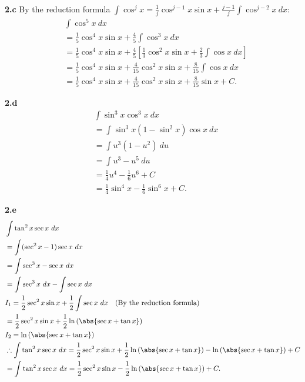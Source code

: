 \documentclass{report}
\begin{document}
    \pagebreak  \bigbreak \noindent 
    \textbf{2.c}
    \bigbreak \noindent 
    By the reduction formula $\int \cos^{j}{x} = \frac{1}{j}\cos^{j-1}{x}\sin{x} + \frac{j-1}{j}\int \cos^{j-2}{x}\ dx $:
    \begin{align*}
        &\int \cos^{5}{x}\ dx \\
        &= \frac{1}{5}\cos^{4}{x}\sin{x} + \frac{4}{5}\int \cos^{3}{x}\ dx \\
        &= \frac{1}{5}\cos^{4}{x}\sin{x} + \frac{4}{5}\left[\frac{1}{3}\cos^{2}{x}\sin{x}+\frac{2}{3}\int \cos{x}\ dx\right] \\
        &= \frac{1}{5}\cos^{4}{x}\sin{x} + \frac{4}{15}\cos^{2}{x}\sin{x}+\frac{8}{15}\int \cos{x}\ dx \\
        &= \frac{1}{5}\cos^{4}{x}\sin{x} + \frac{4}{15}\cos^{2}{x}\sin{x}+\frac{8}{15}\sin{x} + C
    .\end{align*}

    \bigbreak \noindent 
    \textbf{2.d}
    \bigbreak \noindent 
    \begin{align*}
        &\int \sin^{3}{x}\cos^{3}{x}\ dx \\
        &=\int \sin^{3}{x}(1-\sin^{2}{x})\cos{x}\ dx \\
        &=\int u^{3}(1-u^{2})\ du \\
        &=\int u^{3} - u^{5}\ du \\
        &= \frac{1}{4}u^{4} -\frac{1}{6}u^{6} + C \\
        &=\frac{1}{4}\sin^{4}{x} - \frac{1}{6}\sin^{6}{x} + C 
    .\end{align*}

    \bigbreak \noindent 
    \textbf{2.e}
    \bigbreak \noindent 
    \begin{align*}
        &\int \tan^{2}{x}\sec{x}\ dx \\
        &=\int (\sec^{2}{x} -1)\sec{x}\ dx \\
        &= \int \sec^{3}{x} - \sec{x}\ dx \\
        &= \int \sec^{3}{x}\ dx - \int \sec{x}\ dx \\
        &I_{1} = \frac{1}{2}\sec^{2}{x}\sin{x} + \frac{1}{2}\int \sec{x}\ dx \quad \text{(By the reduction formula)} \\
        &= \frac{1}{2}\sec^{2}{x}\sin{x} + \frac{1}{2}\ln{\left(\abs{\sec{x} + \tan{x}}\right)} \\
        &I_{2} = \ln{\left(\abs{\sec{x} + \tan{x}}\right)} \\
        &\therefore \int \tan^{2}{x}\sec{x}\ dx = \frac{1}{2}\sec^{2}{x}\sin{x} + \frac{1}{2}\ln{\left(\abs{\sec{x} + \tan{x}}\right)}-\ln{(\abs{\sec{x} + \tan{x}})} + C \\
        &= \int \tan^{2}{x}\sec{x}\ dx = \frac{1}{2}\sec^{2}{x}\sin{x} - \frac{1}{2}\ln{\left(\abs{\sec{x} + \tan{x}}\right)} + C
    .\end{align*}
\end{document}
